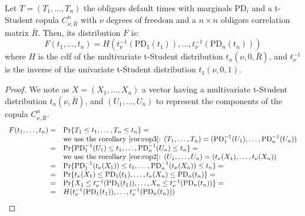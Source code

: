 \documentclass[11pt,fleqn]{book} %
\begin{document}
\begin{proposition}
	\label{prop:dtd}
	Let $T=(T_1,\dots,T_n)$ the obligors default times with marginals 
	$\text{PD}_i$ and a t-Student copula $C_{\nu,\bar{R}}^n$ with $\nu$
	degrees of freedom and a $n {\times} n$ obligors correlation matrix 
	$\bar{R}$. Then, its distribution $F$ is:
	\begin{displaymath}
		F(t_1,\dots,t_n) = H\left(t_\nu^{-1}(\text{PD}_1(t_1)), \dots, t_\nu^{-1}(\text{PD}_n(t_n))\right)
	\end{displaymath}
	where $H$ is the cdf of the multivariate t-Student distribution 
	$t_n(\nu,0,\bar{R})$, and $t_\nu^{-1}$ is the inverse of the univariate 
	t-Student distribution $t_1(\nu,0,1)$.
\end{proposition}
\begin{proof}
	We note as $X=(X_1,\dots,X_n)$ a vector having a multivariate t-Student
	distribution $t_n(\nu,\bar{R})$, and $(U_1,\dots,U_n)$ to represent
	the components of the copula $C_{\nu,\bar{R}}^n$.
	\begin{displaymath}
		\begin{array}{rl}
			F(t_1,\dots,t_n) = & \Pr\{ T_1 \le t_1 , \dots, T_n \le t_n \} =                                    \\
			                   & \text{we use the corollary~\ref{cor:cop3}: }                                   
			(T_1,\dots,T_n) = (\text{PD}_1^{-1}(U_1),\dots,\text{PD}_n^{-1}(U_n)) \\
			=                  & \Pr\{ \text{PD}_1^{-1}(U_1) \le t_1 , \dots , \text{PD}_n^{-1}(U_n) \le t_n \} =               \\
			                   & \text{we use the corollary~\ref{cor:cop2}: }                                   
			(U_1,\dots,U_n) = (t_\nu(X_1),\dots,t_\nu(X_n)) \\
			=                  & \Pr\{ \text{PD}_1^{-1}(t_\nu(X_1)) \le t_1 , \dots , \text{PD}_n^{-1}(t_\nu(X_n)) \le t_n \} = \\
			=                  & \Pr\{ t_\nu(X_1) \le \text{PD}_1(t_1) , \dots , t_\nu(X_n) \le \text{PD}_n(t_n) \} =           \\
			=                  & \Pr\{ X_1 \le t_\nu^{-1}(\text{PD}_1(t_1)) , \dots , X_n \le t_\nu^{-1}(\text{PD}_n(t_n)) \} = \\
			=                  & H(t_\nu^{-1}(\text{PD}_1(t_1)), \dots, t_\nu^{-1}(\text{PD}_n(t_n)))                           \\
		\end{array}
	\end{displaymath}
\end{proof}
\end{document}
